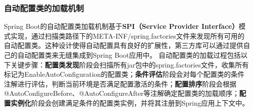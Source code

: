 \subsubsection{自动配置类的加载机制}\label{ux81eaux52a8ux914dux7f6eux7c7bux7684ux52a0ux8f7dux673aux5236} Spring
Boot的自动配置类加载机制基于\textbf{SPI（Service Provider
Interface）}模式实现，通过扫描类路径下的META-INF/spring.factories文件来发现所有可用的自动配置类。这种设计使得自动配置具有良好的扩展性，第三方库可以通过提供自己的自动配置类来无缝集成到Spring
Boot应用中。
自动配置类的加载过程包括以下关键步骤：\textbf{配置类发现}阶段会扫描所有jar包中的spring.factories文件，收集所有标记为EnableAutoConfiguration的配置类；\textbf{条件评估}阶段会对每个配置类的条件注解进行评估，判断当前环境是否满足配置激活的条件；\textbf{配置排序}阶段会根据@AutoConfigureBefore、@AutoConfigureAfter等注解确定配置类的加载顺序；\textbf{配置实例化}阶段会创建满足条件的配置类实例，并将其注册到Spring应用上下文中。
